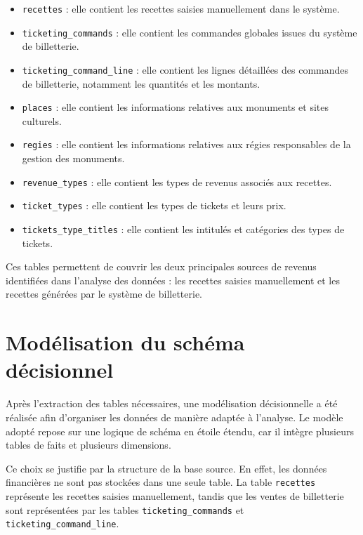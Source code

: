 \documentclass[12pt,a4paper]{report}
\begin{document}
\begin{itemize}
	\item \texttt{recettes} : elle contient les recettes saisies manuellement dans le système.
	\item \texttt{ticketing\_commands} : elle contient les commandes globales issues du système de billetterie.
	\item \texttt{ticketing\_command\_line} : elle contient les lignes détaillées des commandes de billetterie, notamment les quantités et les montants.
	\item \texttt{places} : elle contient les informations relatives aux monuments et sites culturels.
	\item \texttt{regies} : elle contient les informations relatives aux régies responsables de la gestion des monuments.
	\item \texttt{revenue\_types} : elle contient les types de revenus associés aux recettes.
	\item \texttt{ticket\_types} : elle contient les types de tickets et leurs prix.
	\item \texttt{tickets\_type\_titles} : elle contient les intitulés et catégories des types de tickets.
\end{itemize}

Ces tables permettent de couvrir les deux principales sources de revenus identifiées dans l’analyse des données : les recettes saisies manuellement et les recettes générées par le système de billetterie.


\section{Modélisation du schéma décisionnel}

Après l’extraction des tables nécessaires, une modélisation décisionnelle a été réalisée afin d’organiser les données de manière adaptée à l’analyse. Le modèle adopté repose sur une logique de schéma en étoile étendu, car il intègre plusieurs tables de faits et plusieurs dimensions.

Ce choix se justifie par la structure de la base source. En effet, les données financières ne sont pas stockées dans une seule table. La table \texttt{recettes} représente les recettes saisies manuellement, tandis que les ventes de billetterie sont représentées par les tables \texttt{ticketing\_commands} et \texttt{ticketing\_command\_line}.
\end{document}
